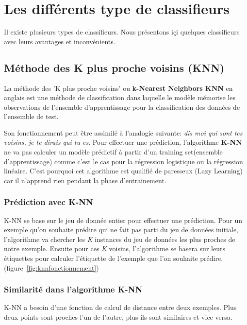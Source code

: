 \section{Les différents type de classifieurs}

Il existe plusieurs types de classifieurs. Nous présentons içi quelques
classifieurs avec leurs avantages et inconvénients.

 \subsection{Méthode des K plus proche voisins (KNN)}

La méthode des 'K plus proche voisins' ou \textbf{k-Nearest Neighbors
KNN} en 
anglais est une méthode de classification dans laquelle le modèle mémorise 
les observations de l’ensemble d’apprentissage pour la classification des 
données de l’ensemble de test.\cite{pradaig}

Son fonctionnement peut être assimilé à l’analogie suivante:
\textit{dis moi qui sont tes voisins, je te dirais qui tu es}.
Pour effectuer une prédiction, l’algorithme \textbf{K-NN} ne va pas calculer
un modèle prédictif à partir d’un training set(ensemble d'apprentissage) comme c’est le cas pour la 
régression logistique ou la régression linéaire. C'est pourquoi cet 
algorithme est qualifié de paresseux (Lazy Learning) car il n’apprend
rien pendant la phase d’entrainement. 

\subsubsection{Prédiction avec K-NN}
K-NN se base sur le jeu de donnée entier pour effectuer une prédiction. Pour 
un exemple qu'on souhaite prédire qui ne fait pas parti du jeu de données \cite{datascientist}
initiale, l’algorithme va chercher les \textit{K} instances du jeu de données les 
plus proches de notre exemple. Ensuite pour ces \textit{K} voisins, l'algorithme
se basera sur leurs étiquettes pour calculer l'étiquette de l'exemple que l'on
souhaite prédire.(figure~\ref{fig:knnfonctionnement})

\subsubsection{Similarité dans l'algorithme K-NN}
K-NN a besoin d’une fonction de calcul de distance entre deux exemples. Plus 
deux points sont proches l’un de l’autre, plus ils sont similaires et vice 
versa\cite{nagesh2019}.

